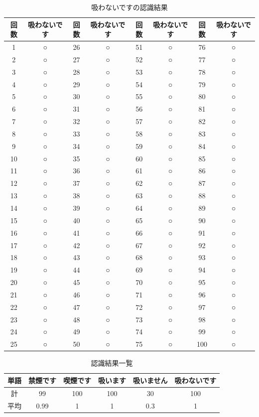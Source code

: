 \documentclass[12pt,oneside]{sotsuken_paper}
\begin{document}
\begin{table}[htb]
\begin{center}
\caption{吸わないですの認識結果}
\begin{tabular}{|c|c|c|c|c|c|c|c|}\hline
回数&吸わないです&回数&吸わないです&回数&吸わないです&回数&吸わないです\\\hline
1&○&26&○&51&○&76&○\\\hline
2&○&27&○&52&○&77&○\\\hline
3&○&28&○&53&○&78&○\\\hline
4&○&29&○&54&○&79&○\\\hline
5&○&30&○&55&○&80&○\\\hline
6&○&31&○&56&○&81&○\\\hline
7&○&32&○&57&○&82&○\\\hline
8&○&33&○&58&○&83&○\\\hline
9&○&34&○&59&○&84&○\\\hline
10&○&35&○&60&○&85&○\\\hline
11&○&36&○&61&○&86&○\\\hline
12&○&37&○&62&○&87&○\\\hline
13&○&38&○&63&○&88&○\\\hline
14&○&39&○&64&○&89&○\\\hline
15&○&40&○&65&○&90&○\\\hline
16&○&41&○&66&○&91&○\\\hline
17&○&42&○&67&○&92&○\\\hline
18&○&43&○&68&○&93&○\\\hline
19&○&44&○&69&○&94&○\\\hline
20&○&45&○&70&○&95&○\\\hline
21&○&46&○&71&○&96&○\\\hline
22&○&47&○&72&○&97&○\\\hline
23&○&48&○&73&○&98&○\\\hline
24&○&49&○&74&○&99&○\\\hline
25&○&50&○&75&○&100&○
\\\hline
\end{tabular}
\label{tab:neversmokrecogresult}
\end{center}
\end{table}


\begin{table}[htb]
\begin{center}
\caption{認識結果一覧}
\begin{tabular}{|c|c|c|c|c|c|}\hline
単語&禁煙です&喫煙です&吸います&吸いません&吸わないです\\\hline
計&99&100&100&30&100\\\hline
平均&0.99&1&1&0.3&1
\\\hline
\end{tabular}
\label{tab:result}
\end{center}
\end{table}
\end{document}
